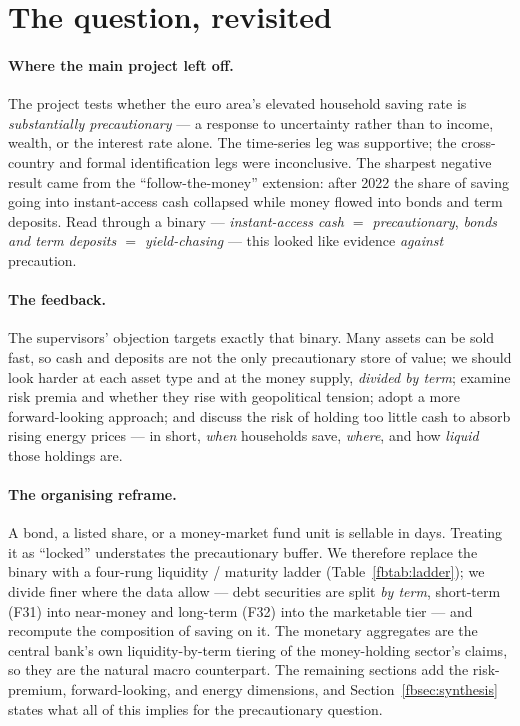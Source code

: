 \documentclass[11pt,a4paper]{article}
\begin{document}
\section{The question, revisited}\label{fbsec:question}

\paragraph{Where the main project left off.} The project tests whether the euro
area's elevated household saving rate is \emph{substantially precautionary} ---
a response to uncertainty rather than to income, wealth, or the interest rate
alone. The time-series leg was supportive; the cross-country and formal
identification legs were inconclusive. The sharpest negative result came from
the ``follow-the-money'' extension: after 2022 the share of saving going into
instant-access cash collapsed while money flowed into bonds and term deposits.
Read through a binary --- \emph{instant-access cash $=$ precautionary},
\emph{bonds and term deposits $=$ yield-chasing} --- this looked like evidence
\emph{against} precaution.

\paragraph{The feedback.} The supervisors' objection targets exactly that
binary. Many assets can be sold fast, so cash and deposits are not the only
precautionary store of value; we should look harder at each asset type and at
the money supply, \emph{divided by term}; examine risk premia and whether they
rise with geopolitical tension; adopt a more forward-looking approach; and
discuss the risk of holding too little cash to absorb rising energy prices ---
in short, \emph{when} households save, \emph{where}, and how \emph{liquid} those
holdings are.

\paragraph{The organising reframe.} A bond, a listed share, or a money-market
fund unit is sellable in days. Treating it as ``locked'' understates the
precautionary buffer. We therefore replace the binary with a four-rung
liquidity / maturity ladder (Table~\ref{fbtab:ladder}); we divide finer where the
data allow --- debt securities are split \emph{by term}, short-term (F31) into
near-money and long-term (F32) into the marketable tier --- and recompute the
composition of saving on it. The monetary aggregates are the central bank's own
liquidity-by-term tiering of the money-holding sector's claims, so they are the
natural macro counterpart. The remaining sections add the risk-premium,
forward-looking, and energy dimensions, and Section~\ref{fbsec:synthesis} states
what all of this implies for the precautionary question.
\end{document}
